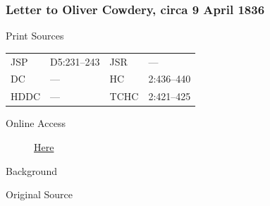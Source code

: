 		\subsubsection{Letter to Oliver Cowdery, circa 9 April 1836}
			\label{EMS-1836-JS-9-APR-1836}
			
			\begin{description}
					\item[Print Sources]
				\end{description}

					\begin{tabular}{p{0.5in}p{1in}p{0.5in}p{1in}}
					JSP	 	& D5:231--243		& JSR 		& --- \\
					DC	 	& ---				& HC 		& 2:436--440 \\
					HDDC 	& ---				& TCHC 		& 2:421--425 \\
					\end{tabular}
				
				\begin{description}
					\item[Online Access] \href{https://www.josephsmithpapers.org/paper-summary/letter-to-oliver-cowdery-circa-9-april-1836/1}{Here}
				\end{description}
				
				\begin{description}
					\item[Background]
				\end{description}
				
				
				\begin{description}
					\item[Original Source]
				\end{description}
				
				
